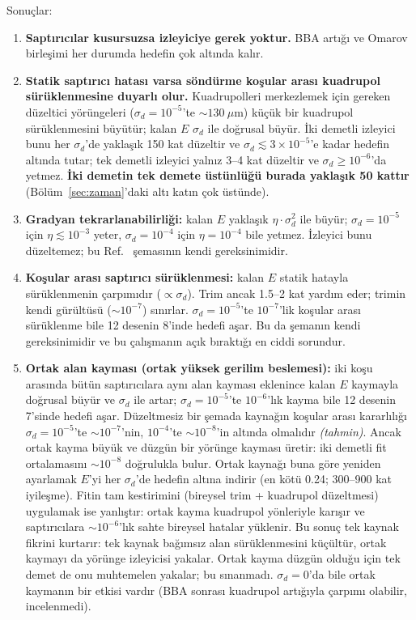 \documentclass[12pt,a4paper]{extarticle}
\newcommand{\tahmin}{\textit{(tahmin)}}
\begin{document}
Sonuçlar:
\begin{enumerate}
\item \textbf{Saptırıcılar kusursuzsa izleyiciye gerek yoktur.} BBA artığı ve Omarov birleşimi her durumda
hedefin çok altında kalır.
\item \textbf{Statik saptırıcı hatası varsa söndürme koşular arası kuadrupol sürüklenmesine duyarlı olur.}
Kuadrupolleri merkezlemek için gereken düzeltici yörüngeleri ($\sigma_d=10^{-5}$'te $\sim130~\mu$m) küçük bir
kuadrupol sürüklenmesini büyütür; kalan $E$ $\sigma_d$ ile doğrusal büyür. İki demetli izleyici bunu her
$\sigma_d$'de yaklaşık 150 kat düzeltir ve $\sigma_d\lesssim3\times10^{-5}$'e kadar hedefin altında tutar; tek
demetli izleyici yalnız 3--4 kat düzeltir ve $\sigma_d\ge10^{-6}$'da yetmez. \textbf{İki demetin tek demete
üstünlüğü burada yaklaşık 50 kattır} (Bölüm~\ref{sec:zaman}'daki altı katın çok üstünde).
\item \textbf{Gradyan tekrarlanabilirliği:} kalan $E$ yaklaşık $\eta\cdot\sigma_d^2$ ile büyür; $\sigma_d=10^{-5}$
için $\eta\lesssim10^{-3}$ yeter, $\sigma_d=10^{-4}$ için $\eta=10^{-4}$ bile yetmez. İzleyici bunu düzeltemez; bu
Ref.~\cite{omarov} şemasının kendi gereksinimidir.
\item \textbf{Koşular arası saptırıcı sürüklenmesi:} kalan $E$ statik hatayla sürüklenmenin çarpımıdır
($\propto\sigma_d$). Trim ancak 1.5--2 kat yardım eder; trimin kendi gürültüsü ($\sim10^{-7}$) sınırlar.
$\sigma_d=10^{-5}$'te $10^{-7}$'lik koşular arası sürüklenme bile 12 desenin 8'inde hedefi aşar. Bu da şemanın
kendi gereksinimidir ve bu çalışmanın açık bıraktığı en ciddi sorundur.
\item \textbf{Ortak alan kayması (ortak yüksek gerilim beslemesi):} iki koşu arasında bütün saptırıcılara aynı
alan kayması eklenince kalan $E$ kaymayla doğrusal büyür ve $\sigma_d$ ile artar; $\sigma_d=10^{-5}$'te $10^{-6}$'lık
kayma bile 12 desenin 7'sinde hedefi aşar. Düzeltmesiz bir şemada kaynağın koşular arası kararlılığı
$\sigma_d=10^{-5}$'te $\sim10^{-7}$'nin, $10^{-4}$'te $\sim10^{-8}$'in altında olmalıdır \tahmin. Ancak ortak kayma
büyük ve düzgün bir yörünge kayması üretir: iki demetli fit ortalamasını $\sim10^{-8}$ doğrulukla bulur. Ortak
kaynağı buna göre yeniden ayarlamak $E$'yi her $\sigma_d$'de hedefin altına indirir (en kötü 0.24; 300--900 kat
iyileşme). Fitin tam kestirimini (bireysel trim + kuadrupol düzeltmesi) uygulamak ise yanlıştır: ortak kayma
kuadrupol yönleriyle karışır ve saptırıcılara $\sim10^{-6}$'lık sahte bireysel hatalar yüklenir. Bu sonuç tek
kaynak fikrini kurtarır: tek kaynak bağımsız alan sürüklenmesini küçültür, ortak kaymayı da yörünge izleyicisi
yakalar. Ortak kayma düzgün olduğu için tek demet de onu muhtemelen yakalar; bu sınanmadı. $\sigma_d=0$'da bile
ortak kaymanın bir etkisi vardır (BBA sonrası kuadrupol artığıyla çarpımı olabilir, incelenmedi).
\end{enumerate}
\end{document}
